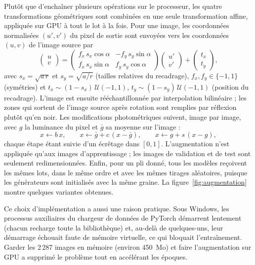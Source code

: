 Plutôt que d'enchaîner plusieurs opérations sur le processeur, les quatre transformations géométriques sont combinées en une seule transformation affine, appliquée sur GPU à tout le lot à la fois. Pour une image, les coordonnées normalisées $(u', v')$ du pixel de sortie sont envoyées vers les coordonnées $(u, v)$ de l'image source par
\begin{equation}
\begin{pmatrix} u \\ v \end{pmatrix} =
\begin{pmatrix} f_x\, s_x \cos\alpha & -f_y\, s_y \sin\alpha \\ f_x\, s_x \sin\alpha & f_y\, s_y \cos\alpha \end{pmatrix}
\begin{pmatrix} u' \\ v' \end{pmatrix} +
\begin{pmatrix} t_x \\ t_y \end{pmatrix},
\label{eq:affine}
\end{equation}
avec $s_x = \sqrt{a\,r}$ et $s_y=\sqrt{a/r}$ (tailles relatives du recadrage), $f_x, f_y \in \{-1, 1\}$ (symétries) et $t_x \sim (1-s_x)\,\mathcal{U}(-1,1)$, $t_y \sim (1-s_y)\,\mathcal{U}(-1,1)$ (position du recadrage). L'image est ensuite rééchantillonnée par interpolation bilinéaire ; les zones qui sortent de l'image source après rotation sont remplies par réflexion plutôt qu'en noir. Les modifications photométriques suivent, image par image, avec $g$ la luminance du pixel et $\bar{g}$ sa moyenne sur l'image :
\begin{equation}
x \leftarrow b\,x, \qquad x \leftarrow \bar{g} + c\,(x-\bar{g}), \qquad x \leftarrow g + s\,(x-g),
\label{eq:photo}
\end{equation}
chaque étape étant suivie d'un écrêtage dans $[0,1]$. L'augmentation n'est appliquée qu'aux images d'apprentissage ; les images de validation et de test sont seulement redimensionnées. Enfin, pour un pli donné, tous les modèles reçoivent les mêmes lots, dans le même ordre et avec les mêmes tirages aléatoires, puisque les générateurs sont initialisés avec la même graine. La figure~\ref{fig:augmentation} montre quelques variantes obtenues.

Ce choix d'implémentation a aussi une raison pratique. Sous Windows, les processus auxiliaires du chargeur de données de PyTorch démarrent lentement (chacun recharge toute la bibliothèque) et, au-delà de quelques-uns, leur démarrage échouait faute de mémoire virtuelle, ce qui bloquait l'entraînement. Garder les 2\,287 images en mémoire (environ 450~Mo) et faire l'augmentation sur GPU a supprimé le problème tout en accélérant les époques.

